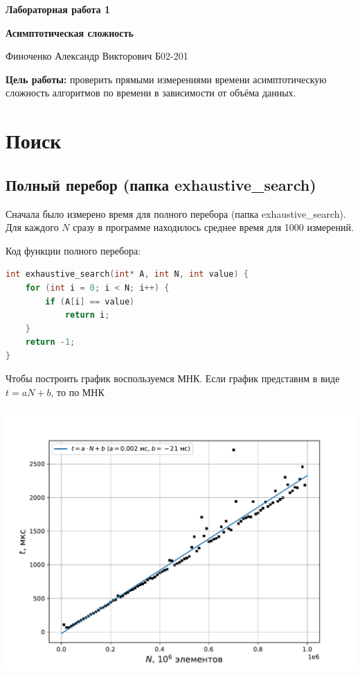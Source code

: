 \documentclass[a4paper,12pt]{article}
\author{Финоченко Александр}
\title{}
\date{\today}
\begin{document}
\begin{center}
\Large{
\textbf{Лабораторная работа 1}

\textbf{Асимптотическая сложность}

Финоченко Александр Викторович Б02-201
}

\end{center}
\large

\textbf{Цель работы:} проверить прямыми измерениями времени асимптотическую сложность алгоритмов по времени в зависимости от объёма данных.


\section*{Поиск}

\subsection*{Полный перебор (папка exhaustive\_search)}
Сначала было измерено время для полного перебора (папка exhaustive\_search). Для каждого $N$ сразу в программе находилось среднее время для 1000 измерений.

Код функции полного перебора:
\begin{lstlisting}[language=C++]
int exhaustive_search(int* A, int N, int value) {
	for (int i = 0; i < N; i++) {
		if (A[i] == value)
			return i;
	}
	return -1;
}
\end{lstlisting}


Чтобы построить график воспользуемся МНК. Если график представим в виде $t = aN+b$, то по МНК
\begin{center}
\includegraphics[scale=0.8]{Figure_1.pdf}
\end{center}
\end{document}
